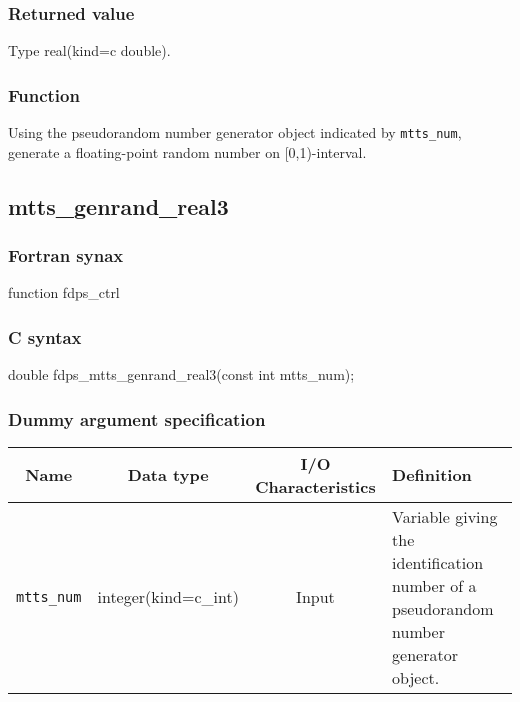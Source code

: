 \subsubsection*{Returned value}
Type real(kind=c double).

\subsubsection*{Function}
Using the pseudorandom number generator object indicated by \texttt{mtts\_num}, generate a floating-point random number on [0,1)-interval.
\clearpage

\subsection{mtts\_genrand\_real3}
\subsubsection*{Fortran synax}
\begin{screen}
\begin{spverbatim}  
function fdps_ctrl%
\end{spverbatim}
\end{screen}

\subsubsection*{C syntax}
\begin{screen}
\begin{spverbatim}  
double fdps_mtts_genrand_real3(const int mtts_num);
\end{spverbatim}
\end{screen}

\subsubsection*{Dummy argument specification}
\begin{table}[h]
\begin{tabularx}{\linewidth}{cccX}
\toprule
\rowcolor{Snow2}
Name & Data type & I/O Characteristics & Definition \\
\midrule
\verb|mtts_num| & integer(kind=c\_int) & Input & Variable giving the identification number of a pseudorandom number generator object.\\
\bottomrule
\end{tabularx}
\end{table}

